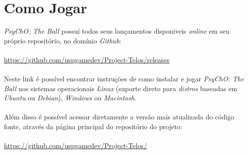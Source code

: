 \section{Como Jogar}
\label{sec:how_to_play}


\textit{PsyChO: The Ball} possuí todos seus lançamentos disponiveis \textit{online} em seu próprio repositório, no domínio \textit{Github}:
\\~\\
\url{https://github.com/uspgamedev/Project-Telos/releases}
\\~\\
Neste link é possível encontrar instruções de como instalar e jogar \textit{PsyChO: The Ball} nos sistemas operacionais \textit{Linux} (suporte direto para \textit{distros} baseadas em \textit{Ubuntu} ou \textit{Debian}), \textit{Windows} ou \textit{Macintosh}.
\\~\\
Além disso é possível acessar diretamente a versão mais atualizada do código fonte, através da página principal do repositório do projeto:
\\~\\
\url{https://github.com/uspgamedev/Project-Telos/}
